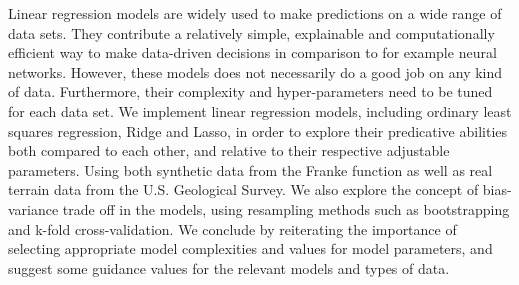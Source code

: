 Linear regression models are widely used to make predictions on a wide range of data sets.
They contribute a relatively simple, explainable and computationally efficient way to make data-driven decisions in comparison to for example neural networks.
However, these models does not necessarily do a good job on any kind of data.
Furthermore, their complexity and hyper-parameters need to be tuned for each data set.
We implement linear regression models, including ordinary least squares regression, Ridge and Lasso, in order to explore their predicative abilities both compared to each other, and relative to their respective adjustable parameters. 
Using both synthetic data from the Franke function \citep[p. 13]{frank} as well as real terrain data from the U.S. Geological Survey. 
We also explore the concept of bias-variance trade off in the models, using resampling methods such as bootstrapping and k-fold cross-validation. 
We conclude by reiterating the importance of selecting appropriate model complexities and values for model parameters, and suggest some guidance values for the relevant models and types of data. 